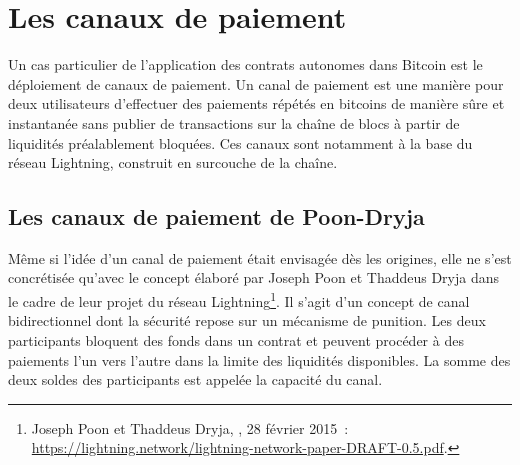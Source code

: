 \section*{Les canaux de paiement}

Un cas particulier de l'application des contrats autonomes dans Bitcoin est le déploiement de canaux de paiement. Un canal de paiement est une manière pour deux utilisateurs d'effectuer des paiements répétés en bitcoins de manière sûre et instantanée sans publier de transactions sur la chaîne de blocs à partir de liquidités préalablement bloquées. Ces canaux sont notamment à la base du réseau Lightning, construit en surcouche de la chaîne.


\subsection{Les canaux de paiement de Poon-Dryja} Même si l'idée d'un canal de paiement était envisagée dès les origines, elle ne s'est concrétisée qu'avec le concept élaboré par Joseph Poon et Thaddeus Dryja dans le cadre de leur projet du réseau Lightning\footnote{Joseph Poon et Thaddeus Dryja, , 28 février 2015~: \url{https://lightning.network/lightning-network-paper-DRAFT-0.5.pdf}.}. Il s'agit d'un concept de canal bidirectionnel dont la sécurité repose sur un mécanisme de punition. Les deux participants bloquent des fonds dans un contrat et peuvent procéder à des paiements l'un vers l'autre dans la limite des liquidités disponibles. La somme des deux soldes des participants est appelée la capacité du canal.


